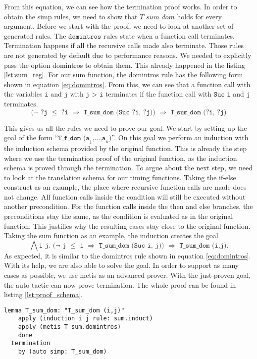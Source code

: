 From this equation, we can see how the termination proof works.
In order to obtain the simp rules, we need to show that $T\_sum\_dom$ holds for every argument.
Before we start with the proof, we need to look at another set of generated rules.
The $\texttt{domintros}$ rules state when a function call terminates.
Termination happens if all the recursive calls made also terminate.
Those rules are not generated by default due to performance reasons.
We needed to explicitly pass the option domintros to obtain them.
This already happened in the listing \ref{lst:sum_reg}.
For our sum function, the domintros rule has the following form shown in equation \ref{eq:domintros}.
From this, we can see that a function call with the variables $\texttt{i}$ and $\texttt{j}$ with $\texttt{j > i}$ terminates
if the function call with $\texttt{Suc i}$ and $\texttt{j}$ terminates.
\begin{equation}
  \texttt{($\lnot$ ?j $\le$ ?i $\Longrightarrow$ T\_sum\_dom (Suc ?i, ?j)) $\Longrightarrow$ T\_sum\_dom (?i, ?j)}
\label{eq:domintros}
\end{equation}

This gives us all the rules we need to prove our goal.
We start by setting up the goal of the form ``$\texttt{T\_f\_dom (a}_{1}\texttt{,}\dots\texttt{,a}_{n}\texttt{)}$''.
On this goal we perform an induction with the induction schema provided by the original function.
This is already the step where we use the termination proof of the original function,
as the induction schema is proved through the termination.
To argue about the next step, we need to look at the translation schema for our timing functions.
Taking the if-else construct as an example, the place where recursive function calls are made does not change.
All function calls inside the condition will still be executed without another precondition.
For the function calls inside the then and else branches, the preconditions stay the same, as the condition is evaluated as in the original function.
This justifies why the resulting cases stay close to the original function.
Taking the sum function as an example, the induction creates the goal
\begin{equation*}
  \texttt{$\bigwedge$i j. ($\lnot$ j $\le$ i $\Longrightarrow$ T\_sum\_dom (Suc i, j)) $\Longrightarrow$ T\_sum\_dom (i,j)}.
\end{equation*}
As expected, it is similar to the domintros rule shown in equation \ref{eq:domintros}.
With its help, we are also able to solve the goal.
In order to support as many cases as possible, we use metis as an advanced prover.
With the just-proven goal, the auto tactic can now prove termination.
The whole proof can be found in listing \ref{lst:proof_schema}.
\begin{lstlisting}[language=isabelle,mathescape=true,label=lst:proof_schema,caption=Proof schema over dom with help of original function]
  lemma T_sum_dom: "T_sum_dom (i,j)"
    apply (induction i j rule: sum.induct)
    apply (metis T_sum.domintros)
    done
  termination
    by (auto simp: T_sum_dom)
\end{lstlisting}

